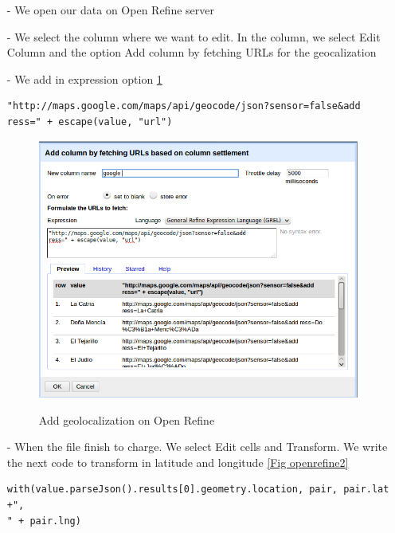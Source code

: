 \documentclass[10pt,a4paper]{article}
\begin{document}
\begin{itemize}
\item[-] We open our data on Open Refine server
\item[-] We select the column where we want to edit. In the column, we select Edit Column and the option Add column by fetching URLs for the geocalization
\item[-]We add in expression option \ref{openrefine1}
\begin{verbatim}
"http://maps.google.com/maps/api/geocode/json?sensor=false&add
ress=" + escape(value, "url")
\end{verbatim}

\begin{figure}[hdp]
\centering
\includegraphics[scale=0.50]{openrefine1.png}
\label{openrefine1}
\caption{Add geolocalization on Open Refine}
\end{figure}

\item[-] When the file finish to charge. We select Edit cells and Transform. We write the next code to transform in latitude and longitude \ref{Fig openrefine2}
\begin{verbatim}
with(value.parseJson().results[0].geometry.location, pair, pair.lat +",
" + pair.lng)
\end{verbatim}


\end{itemize}
\end{document}
